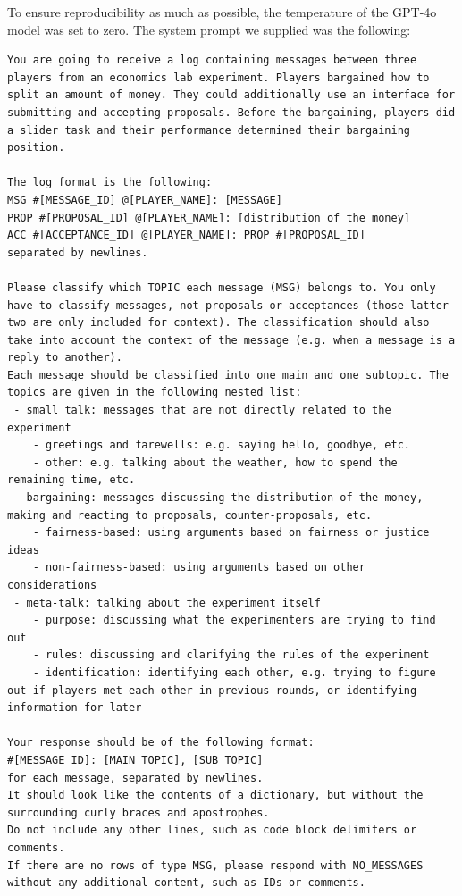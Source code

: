 To ensure reproducibility as much as possible, the temperature of the GPT-4o model was set to zero. The system prompt we supplied was the following:
\begin{lstlisting}[captionpos=b,caption=System prompt for GPT-4o]
You are going to receive a log containing messages between three players from an economics lab experiment. Players bargained how to split an amount of money. They could additionally use an interface for submitting and accepting proposals. Before the bargaining, players did a slider task and their performance determined their bargaining position.

The log format is the following:
MSG #[MESSAGE_ID] @[PLAYER_NAME]: [MESSAGE]
PROP #[PROPOSAL_ID] @[PLAYER_NAME]: [distribution of the money]
ACC #[ACCEPTANCE_ID] @[PLAYER_NAME]: PROP #[PROPOSAL_ID]
separated by newlines.

Please classify which TOPIC each message (MSG) belongs to. You only have to classify messages, not proposals or acceptances (those latter two are only included for context). The classification should also take into account the context of the message (e.g. when a message is a reply to another).
Each message should be classified into one main and one subtopic. The topics are given in the following nested list:
 - small talk: messages that are not directly related to the experiment
    - greetings and farewells: e.g. saying hello, goodbye, etc.
    - other: e.g. talking about the weather, how to spend the remaining time, etc.
 - bargaining: messages discussing the distribution of the money, making and reacting to proposals, counter-proposals, etc.
    - fairness-based: using arguments based on fairness or justice ideas
    - non-fairness-based: using arguments based on other considerations
 - meta-talk: talking about the experiment itself
    - purpose: discussing what the experimenters are trying to find out
    - rules: discussing and clarifying the rules of the experiment
    - identification: identifying each other, e.g. trying to figure out if players met each other in previous rounds, or identifying information for later

Your response should be of the following format:
#[MESSAGE_ID]: [MAIN_TOPIC], [SUB_TOPIC]
for each message, separated by newlines.
It should look like the contents of a dictionary, but without the surrounding curly braces and apostrophes.
Do not include any other lines, such as code block delimiters or comments.
If there are no rows of type MSG, please respond with NO_MESSAGES without any additional content, such as IDs or comments.
\end{lstlisting}

